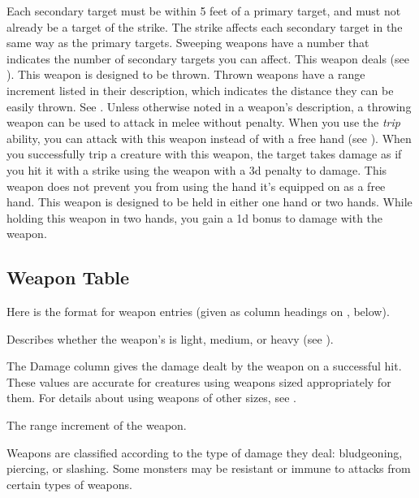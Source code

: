             Each secondary target must be within 5 feet of a primary target, and must not already be a target of the strike.
            The strike affects each secondary target in the same way as the primary targets.
            Sweeping weapons have a number that indicates the number of secondary targets you can affect.
             This weapon deals  (see ).
             This weapon is designed to be thrown. Thrown weapons have a range increment listed in their description, which indicates the distance they can be easily thrown. See .
            Unless otherwise noted in a weapon's description, a throwing weapon can be used to attack in melee without penalty.
             When you use the \textit{trip} ability, you can attack with this weapon instead of with a free hand (see ).
            When you successfully trip a creature with this weapon, the target takes damage as if you hit it with a strike using the weapon with a \minus3d penalty to damage.
             This weapon does not prevent you from using the hand it's equipped on as a free hand.
             This weapon is designed to be held in either one hand or two hands.
            While holding this weapon in two hands, you gain a \plus1d bonus to damage with the weapon.

    \subsection{Weapon Table}
        Here is the format for weapon entries (given as column headings on , below).

         Describes whether the weapon's  is light, medium, or heavy (see ).

         The Damage column gives the damage dealt by the weapon on a successful hit.
        These values are accurate for creatures using weapons sized appropriately for them.
        For details about using weapons of other sizes, see .

         The range increment of the weapon.

         Weapons are classified according to the type of damage they deal: bludgeoning, piercing, or slashing. Some monsters may be resistant or immune to attacks from certain types of weapons.

